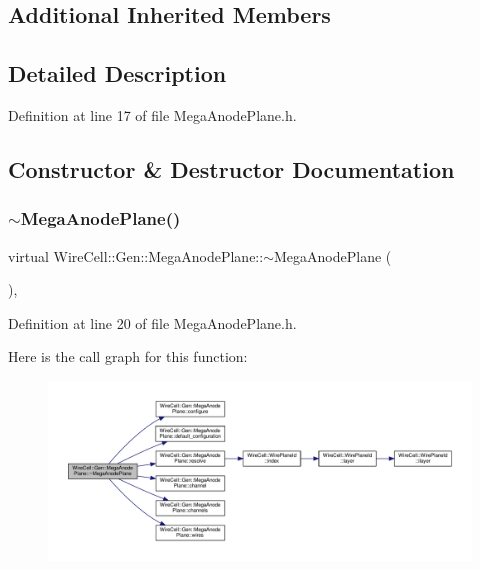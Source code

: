 \subsection*{Additional Inherited Members}


\subsection{Detailed Description}


Definition at line 17 of file Mega\+Anode\+Plane.\+h.



\subsection{Constructor \& Destructor Documentation}
\mbox{\label{class_wire_cell_1_1_gen_1_1_mega_anode_plane_aa9912010c3155fa7e010faf6fe1f01d7}} 
\subsubsection{\texorpdfstring{$\sim$\+Mega\+Anode\+Plane()}{~MegaAnodePlane()}}
{\footnotesize\ttfamily virtual Wire\+Cell\+::\+Gen\+::\+Mega\+Anode\+Plane\+::$\sim$\+Mega\+Anode\+Plane (\begin{DoxyParamCaption}{ }\end{DoxyParamCaption})\hspace{0.3cm}{\ttfamily [inline]}, {\ttfamily [virtual]}}



Definition at line 20 of file Mega\+Anode\+Plane.\+h.

Here is the call graph for this function\+:
\nopagebreak
\begin{figure}[H]
\begin{center}
\leavevmode
\includegraphics[width=350pt]{class_wire_cell_1_1_gen_1_1_mega_anode_plane_aa9912010c3155fa7e010faf6fe1f01d7_cgraph}
\end{center}
\end{figure}


